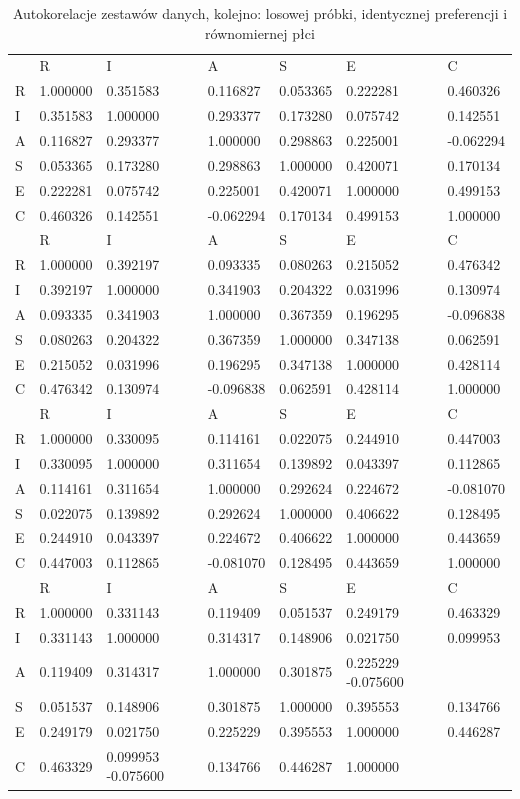 \documentclass[12pt,a4paper,oneside]{report} %
\begin{document}
\begin{table}
\begin{tabular}{l|l|l|l|l|l|l}
\hline
 & R & I & A & S & E & C \\
R & 1.000000 & 0.351583 & 0.116827 & 0.053365 & 0.222281 & 0.460326 \\
I & 0.351583 & 1.000000 & 0.293377 & 0.173280 & 0.075742 & 0.142551 \\
A & 0.116827 & 0.293377 & 1.000000 & 0.298863 & 0.225001 & -0.062294 \\
S & 0.053365 & 0.173280 & 0.298863 & 1.000000 & 0.420071 & 0.170134 \\
E & 0.222281 & 0.075742 & 0.225001 & 0.420071 & 1.000000 & 0.499153 \\
C & 0.460326 & 0.142551 & -0.062294 & 0.170134 & 0.499153 & 1.000000 \\
\hline
 & R & I & A & S & E & C \\
R & 1.000000 & 0.392197 & 0.093335 & 0.080263 & 0.215052 & 0.476342 \\
I & 0.392197 & 1.000000 & 0.341903 & 0.204322 & 0.031996 & 0.130974 \\
A & 0.093335 & 0.341903 & 1.000000 & 0.367359 & 0.196295 & -0.096838 \\
S & 0.080263 & 0.204322 & 0.367359 & 1.000000 & 0.347138 & 0.062591 \\
E & 0.215052 & 0.031996 & 0.196295 & 0.347138 & 1.000000 & 0.428114 \\
C & 0.476342 & 0.130974 & -0.096838 & 0.062591 & 0.428114 & 1.000000 \\
\hline
 & R & I & A & S & E & C \\
R & 1.000000 & 0.330095 & 0.114161 & 0.022075 & 0.244910 & 0.447003 \\
I & 0.330095 & 1.000000 & 0.311654 & 0.139892 & 0.043397 & 0.112865 \\
A & 0.114161 & 0.311654 & 1.000000 & 0.292624 & 0.224672 & -0.081070 \\
S & 0.022075 & 0.139892 & 0.292624 & 1.000000 & 0.406622 & 0.128495 \\
E & 0.244910 & 0.043397 & 0.224672 & 0.406622 & 1.000000 & 0.443659 \\
C & 0.447003 & 0.112865 & -0.081070 & 0.128495 & 0.443659 & 1.000000 \\
\hline
 & R & I & A & S & E & C \\ 
R & 1.000000 & 0.331143 & 0.119409 & 0.051537 & 0.249179 & 0.463329 \\ 
I & 0.331143 & 1.000000 & 0.314317 & 0.148906 & 0.021750 & 0.099953 \\ 
A & 0.119409 & 0.314317 & 1.000000 & 0.301875 & 0.225229 -0.075600 \\ 
S & 0.051537 & 0.148906 & 0.301875 & 1.000000 & 0.395553 & 0.134766 \\ 
E & 0.249179 & 0.021750 & 0.225229 & 0.395553 & 1.000000 & 0.446287 \\ 
C & 0.463329 & 0.099953 -0.075600 & 0.134766 & 0.446287 & 1.000000 \\ 
\hline
\end{tabular}
\caption{Autokorelacje zestawów danych, kolejno: losowej próbki, identycznej preferencji i równomiernej płci}
\label{autokorelacja}
\end{table}
\end{document}
